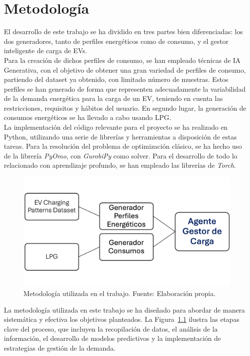 \chapter{Metodología}
El desarrollo de este trabajo se ha dividido en tres partes bien diferenciadas: los dos generadores,
tanto de perfiles energéticos como de consumo, y el gestor inteligente de carga de EVs.\\


Para la creación de dichos perfiles de consumo, se han empleado técnicas de IA Generativa, con el 
objetivo de obtener una gran variedad de perfiles de consumo, partiendo del dataset ya obtenido, 
con limitado número de muestras. Estos perfiles se han generado de forma que representen 
adecuadamente la variabilidad de la demanda energética para la carga de un EV, teniendo en cuenta
las restricciones, requisitos y hábitos del usuario. En segundo lugar, la generación de consumos 
energéticos se ha llevado a cabo usando LPG.\\

La implementación del código relevante para el proyecto se ha realizado en Python, utilizando
una serie de librerías y herramientas a disposición de estas tareas. Para la resolución del 
problema de optimización clásico, se ha hecho uso de la librería \textit{PyOmo}, con 
\textit{GurobiPy} como solver. Para el desarrollo de todo lo relacionado con aprendizaje profundo, 
se han empleado las librerías de \textit{Torch}.\\

\begin{figure}[ht]
    \centering
    \includegraphics[width=1\textwidth]{images/metodologia.png}
    \caption{Metodología utilizada en el trabajo. Fuente: Elaboración propia.}
    \label{fig:metodologia}
\end{figure}

La metodología utilizada en este trabajo se ha diseñado para abordar de manera sistemática y 
efectiva los objetivos planteados. La Figura~\ref{fig:metodologia} ilustra las etapas clave del 
proceso, que incluyen la recopilación de datos, el análisis de la información, el desarrollo de 
modelos predictivos y la implementación de estrategias de gestión de la demanda.\\